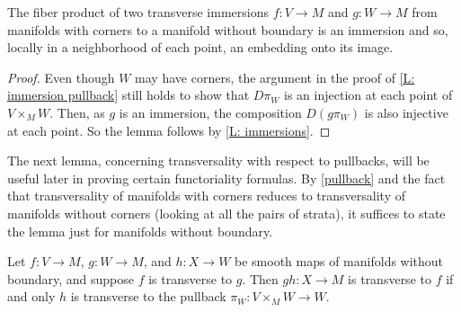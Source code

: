 \begin{lemma}
	The fiber product of two transverse immersions $f \colon V \to M$ and $g \colon W \to M$ from manifolds with corners to a manifold without boundary is an immersion and so, locally in a neighborhood of each point, an embedding onto its image.
\end{lemma}
\begin{proof}
	Even though $W$ may have corners, the argument in the proof of \cref{L: immersion pullback} still holds to show that $D \pi_W$ is an injection at each point of $V \times_M W$. 
	Then, as $g$ is an immersion, the composition $D(g \pi_W)$ is also injective at each point.
	So the lemma follows by \cref{L: immersions}.
\end{proof}

The next lemma, concerning transversality with respect to pullbacks, will be useful later in proving certain functoriality formulas. 
By \cref{pullback} and the fact that transversality of manifolds with corners reduces to transversality of manifolds without corners (looking at all the pairs of strata), it suffices to state the lemma just for manifolds without boundary.

\begin{lemma}\label{L: transverse to pullback}
	Let $f \colon V \to M$, $g \colon W \to M$, and $h \colon X \to W$ be smooth maps of manifolds without boundary, and suppose $f$ is transverse to $g$.
	Then $gh \colon X \to M$ is transverse to $f$ if and only $h$ is transverse to the pullback $\pi_W \colon V \times_M W \to W$.
\end{lemma}

